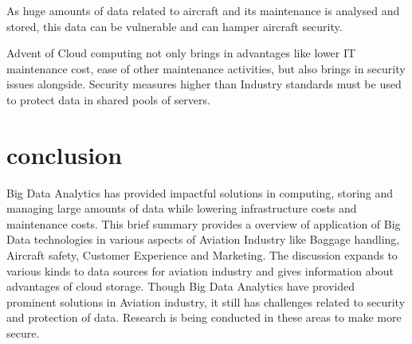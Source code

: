 \documentclass[sigconf]{acmart}
\begin{document}
As huge amounts of data related to aircraft and its maintenance is analysed and stored, this data can be vulnerable and can hamper aircraft security.

Advent of Cloud computing not only brings in advantages like lower IT maintenance cost, ease of other maintenance activities, but also brings in security issues alongside. Security measures higher than Industry standards must be used to protect data in shared pools of servers.


\section{conclusion}

Big Data Analytics has provided impactful solutions in computing, storing and managing large amounts of data while lowering infrastructure costs and maintenance costs. This brief summary provides a overview of application of Big Data technologies in various aspects of Aviation Industry like Baggage handling, Aircraft safety, Customer Experience and Marketing. The discussion expands to various kinds to data sources for aviation industry and gives information about advantages of cloud storage. Though Big Data Analytics have provided prominent solutions in Aviation industry, it still has challenges related to security and protection of data. Research is being conducted in these areas to make more secure.


 
\end{document}
